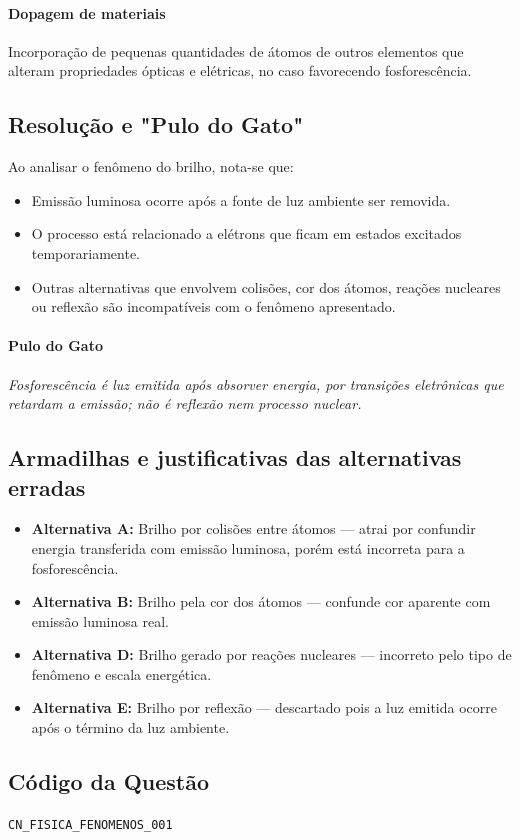 \documentclass{article}
\begin{document}
\paragraph{Dopagem de materiais}
Incorporação de pequenas quantidades de átomos de outros elementos que alteram propriedades ópticas e elétricas, no caso favorecendo fosforescência.

\subsection*{Resolução e "Pulo do Gato"}

Ao analisar o fenômeno do brilho, nota-se que:
\begin{itemize}
  \item Emissão luminosa ocorre após a fonte de luz ambiente ser removida.
  \item O processo está relacionado a elétrons que ficam em estados excitados temporariamente.
  \item Outras alternativas que envolvem colisões, cor dos átomos, reações nucleares ou reflexão são incompatíveis com o fenômeno apresentado.
\end{itemize}

\paragraph{Pulo do Gato}
\textit{Fosforescência é luz emitida após absorver energia, por transições eletrônicas que retardam a emissão; não é reflexão nem processo nuclear.}

\subsection*{Armadilhas e justificativas das alternativas erradas}

\begin{itemize}
  \item \textbf{Alternativa A:} Brilho por colisões entre átomos — atrai por confundir energia transferida com emissão luminosa, porém está incorreta para a fosforescência.
  \item \textbf{Alternativa B:} Brilho pela cor dos átomos — confunde cor aparente com emissão luminosa real.
  \item \textbf{Alternativa D:} Brilho gerado por reações nucleares — incorreto pelo tipo de fenômeno e escala energética.
  \item \textbf{Alternativa E:} Brilho por reflexão — descartado pois a luz emitida ocorre após o término da luz ambiente.
\end{itemize}

\subsection*{Código da Questão}

\texttt{CN\_FISICA\_FENOMENOS\_001}
\end{document}
